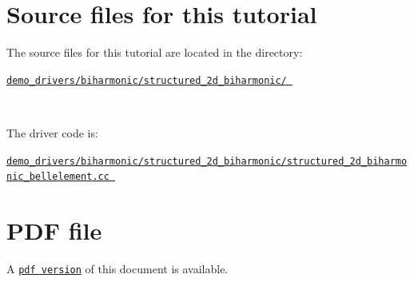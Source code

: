  

\hypertarget{index_sources}{}\section{Source files for this tutorial}\label{index_sources}

\begin{DoxyItemize}
\item The source files for this tutorial are located in the directory\+:~\newline
~\newline
\begin{center} \href{../../../../demo_drivers/biharmonic/structured_2d_biharmonic/}{\tt demo\+\_\+drivers/biharmonic/structured\+\_\+2d\+\_\+biharmonic/ } \end{center} ~\newline

\item The driver code is\+: ~\newline
~\newline
\begin{center} \href{
../../../../
demo_drivers/biharmonic/structured_2d_biharmonic/structured_2d_biharmonic_bellelement.cc
}{\tt demo\+\_\+drivers/biharmonic/structured\+\_\+2d\+\_\+biharmonic/structured\+\_\+2d\+\_\+biharmonic\+\_\+bellelement.\+cc } \end{center} 
\end{DoxyItemize}

 

 \hypertarget{index_pdf}{}\section{P\+D\+F file}\label{index_pdf}
A \href{../latex/refman.pdf}{\tt pdf version} of this document is available. 
